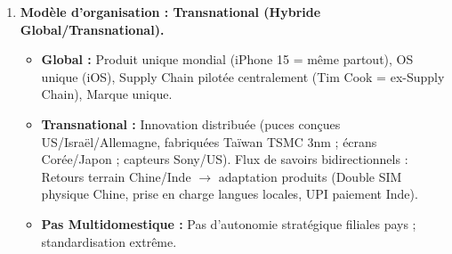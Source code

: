 \documentclass[11pt]{article}
\begin{document}
\begin{exoresolu}
\begin{enumerate}
        \item \textbf{Modèle d'organisation : \textbf{Transnational (Hybride Global/Transnational)}.}
            \begin{itemize}
                \item \textbf{Global :} Produit unique mondial (iPhone 15 = même partout), OS unique (iOS), Supply Chain pilotée centralement (Tim Cook = ex-Supply Chain), Marque unique.
                \item \textbf{Transnational :} Innovation distribuée (puces conçues US/Israël/Allemagne, fabriquées Taïwan TSMC 3nm ; écrans Corée/Japon ; capteurs Sony/US). Flux de savoirs bidirectionnels : Retours terrain Chine/Inde $\rightarrow$ adaptation produits (Double SIM physique Chine, prise en charge langues locales, UPI paiement Inde).
                \item \textbf{Pas Multidomestique :} Pas d'autonomie stratégique filiales pays ; standardisation extrême.
            \end{itemize}
        

\end{enumerate}
\end{exoresolu}
\end{document}
